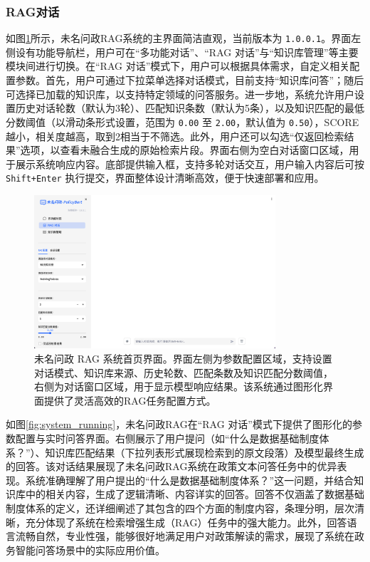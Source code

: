 \documentclass[12pt, a4paper]{ctexart}
\begin{document}
\subsubsection{RAG对话}
如图\ref{fig:home_page}所示，未名问政RAG系统的主界面简洁直观，当前版本为 \texttt{1.0.0.1}。界面左侧设有功能导航栏，用户可在“多功能对话”、“RAG 对话”与“知识库管理”等主要模块间进行切换。在“RAG 对话”模式下，用户可以根据具体需求，自定义相关配置参数。首先，用户可通过下拉菜单选择对话模式，目前支持“知识库问答”；随后可选择已加载的知识库，以支持特定领域的问答服务。进一步地，系统允许用户设置历史对话轮数（默认为3轮）、匹配知识条数（默认为5条），以及知识匹配的最低分数阈值（以滑动条形式设置，范围为 \texttt{0.00} 至 \texttt{2.00}，默认值为 \texttt{0.50}），SCORE越小，相关度越高，取到2相当于不筛选。此外，用户还可以勾选“仅返回检索结果”选项，以查看未融合生成的原始检索片段。界面右侧为空白对话窗口区域，用于展示系统响应内容。底部提供输入框，支持多轮对话交互，用户输入内容后可按 \texttt{Shift+Enter} 执行提交，界面整体设计清晰高效，便于快速部署和应用。
\begin{figure}[H]
    \centering
    \includegraphics[width=0.8\textwidth]{./images/home_page.png}
    \caption{未名问政 RAG 系统首页界面。界面左侧为参数配置区域，支持设置对话模式、知识库来源、历史轮数、匹配条数及知识匹配分数阈值，右侧为对话窗口区域，用于显示模型响应结果。该系统通过图形化界面提供了灵活高效的RAG任务配置方式。}
    \label{fig:home_page}
\end{figure}

如图\ref{fig:system_running}，未名问政RAG在“RAG 对话”模式下提供了图形化的参数配置与实时问答界面。右侧展示了用户提问（如“什么是数据基础制度体系？”）、知识库匹配结果（下拉列表形式展现检索到的原文段落）及模型最终生成的回答。该对话结果展现了未名问政RAG系统在政策文本问答任务中的优异表现。系统准确理解了用户提出的“什么是数据基础制度体系？”这一问题，并结合知识库中的相关内容，生成了逻辑清晰、内容详实的回答。回答不仅涵盖了数据基础制度体系的定义，还详细阐述了其包含的四个方面的制度内容，条理分明，层次清晰，充分体现了系统在检索增强生成（RAG）任务中的强大能力。此外，回答语言流畅自然，专业性强，能够很好地满足用户对政策解读的需求，展现了系统在政务智能问答场景中的实际应用价值。
\end{document}
